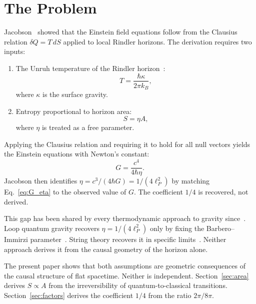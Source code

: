 \documentclass[12pt,a4paper]{article}
\begin{document}
\section{The Problem}
\label{sec:problem}

Jacobson~\citep{Jacobson1995} showed that the Einstein field equations
follow from the Clausius relation $\delta Q = T\,dS$ applied to local
Rindler horizons. The derivation requires two inputs:

\begin{enumerate}
\item The Unruh temperature of the Rindler horizon~\citep{Unruh1976,
Davies1975}:
\begin{equation}
T = \frac{\hbar\kappa}{2\pi k_B},
\label{eq:unruh}
\end{equation}
where $\kappa$ is the surface gravity.

\item Entropy proportional to horizon area:
\begin{equation}
S = \eta A,
\label{eq:S_eta_A}
\end{equation}
where $\eta$ is treated as a free parameter.
\end{enumerate}

Applying the Clausius relation and requiring it to hold for all null
vectors yields the Einstein equations with Newton's constant:
\begin{equation}
G = \frac{c^4}{4\hbar\eta}.
\label{eq:G_eta}
\end{equation}
Jacobson then identifies $\eta = c^3/(4\hbar G) = 1/(4\ell_P^2)$ by
matching Eq.~\eqref{eq:G_eta} to the observed value of $G$. The
coefficient $1/4$ is recovered, not derived.

This gap has been shared by every thermodynamic approach to gravity
since~\citep{CaiKim2005,Padmanabhan2010}. Loop quantum gravity recovers
$\eta = 1/(4\ell_P^2)$ only by fixing the Barbero--Immirzi
parameter~\citep{Rovelli1995}. String theory recovers it in specific
limits~\citep{Strominger1996}. Neither approach derives it from the
causal geometry of the horizon alone.

The present paper shows that both assumptions are geometric
consequences of the causal structure of flat spacetime. Neither
is independent. Section~\ref{sec:area} derives $S \propto A$
from the irreversibility of quantum-to-classical transitions.
Section~\ref{sec:factors} derives the coefficient $1/4$ from
the ratio $2\pi/8\pi$.
\end{document}
